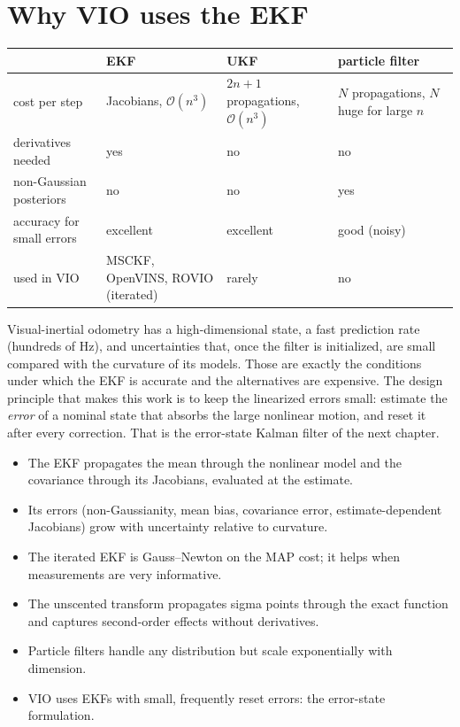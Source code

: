 \section{Why VIO uses the EKF}

\begin{center}\small
\begin{tabularx}{\textwidth}{@{}>{\raggedright\arraybackslash}p{}>{\raggedright\arraybackslash}X>{\raggedright\arraybackslash}X>{\raggedright\arraybackslash}X@{}}
\toprule
 & EKF & UKF & particle filter \\
\midrule
cost per step & Jacobians, $\mathcal{O}(n^3)$ & $2n + 1$ propagations, $\mathcal{O}(n^3)$ & $N$ propagations, $N$ huge for large $n$ \\
derivatives needed & yes & no & no \\
non-Gaussian posteriors & no & no & yes \\
accuracy for small errors & excellent & excellent & good (noisy) \\
used in VIO & MSCKF, OpenVINS, ROVIO (iterated) & rarely & no \\
\bottomrule
\end{tabularx}
\end{center}

Visual-inertial odometry has a high-dimensional state, a fast prediction rate (hundreds of Hz), and uncertainties that, once the filter is initialized,
are small compared with the curvature of its models. Those are exactly the conditions under which the EKF is accurate and the alternatives are
expensive. The design principle that makes this work is to keep the linearized errors small: estimate the \emph{error} of a nominal state that
absorbs the large nonlinear motion, and reset it after every correction. That is the error-state Kalman filter of the next chapter.

\begin{takeaways}
\begin{itemize}
  \item The EKF propagates the mean through the nonlinear model and the covariance through its Jacobians, evaluated at the estimate.
  \item Its errors (non-Gaussianity, mean bias, covariance error, estimate-dependent Jacobians) grow with uncertainty relative to curvature.
  \item The iterated EKF is Gauss--Newton on the MAP cost; it helps when measurements are very informative.
  \item The unscented transform propagates sigma points through the exact function and captures second-order effects without derivatives.
  \item Particle filters handle any distribution but scale exponentially with dimension.
  \item VIO uses EKFs with small, frequently reset errors: the error-state formulation.
\end{itemize}
\end{takeaways}

